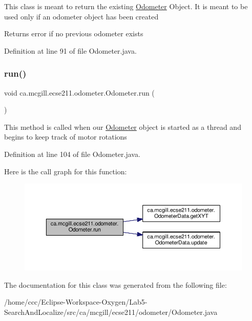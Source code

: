This class is meant to return the existing \hyperlink{classca_1_1mcgill_1_1ecse211_1_1odometer_1_1_odometer}{Odometer} Object. It is meant to be used only if an odometer object has been created

\begin{DoxyReturn}{Returns}
error if no previous odometer exists 
\end{DoxyReturn}


Definition at line 91 of file Odometer.\+java.

\mbox{\label{classca_1_1mcgill_1_1ecse211_1_1odometer_1_1_odometer_af0ff4c5121973a8310cf986e25fa0d87}} 
\subsubsection{\texorpdfstring{run()}{run()}}
{\footnotesize\ttfamily void ca.\+mcgill.\+ecse211.\+odometer.\+Odometer.\+run (\begin{DoxyParamCaption}{ }\end{DoxyParamCaption})}

This method is called when our \hyperlink{classca_1_1mcgill_1_1ecse211_1_1odometer_1_1_odometer}{Odometer} object is started as a thread and begins to keep track of motor rotations 

Definition at line 104 of file Odometer.\+java.

Here is the call graph for this function\+:
\nopagebreak
\begin{figure}[H]
\begin{center}
\leavevmode
\includegraphics[width=350pt]{classca_1_1mcgill_1_1ecse211_1_1odometer_1_1_odometer_af0ff4c5121973a8310cf986e25fa0d87_cgraph}
\end{center}
\end{figure}


The documentation for this class was generated from the following file\+:\begin{DoxyCompactItemize}
\item 
/home/ccc/\+Eclipse-\/\+Workspace-\/\+Oxygen/\+Lab5-\/\+Search\+And\+Localize/src/ca/mcgill/ecse211/odometer/Odometer.\+java\end{DoxyCompactItemize}
